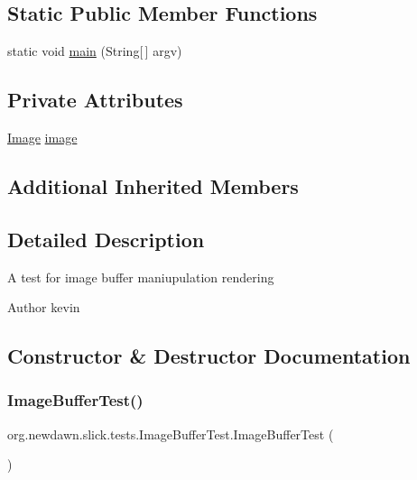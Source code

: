 \subsection*{Static Public Member Functions}
\begin{DoxyCompactItemize}
\item 
static void \mbox{\hyperlink{classorg_1_1newdawn_1_1slick_1_1tests_1_1_image_buffer_test_a02f4433e945ad1759d1de32c3f70757f}{main}} (String\mbox{[}$\,$\mbox{]} argv)
\end{DoxyCompactItemize}
\subsection*{Private Attributes}
\begin{DoxyCompactItemize}
\item 
\mbox{\hyperlink{classorg_1_1newdawn_1_1slick_1_1_image}{Image}} \mbox{\hyperlink{classorg_1_1newdawn_1_1slick_1_1tests_1_1_image_buffer_test_afde40a9c63dc29ce4951b86e0a721c8a}{image}}
\end{DoxyCompactItemize}
\subsection*{Additional Inherited Members}


\subsection{Detailed Description}
A test for image buffer maniupulation rendering

\begin{DoxyAuthor}{Author}
kevin 
\end{DoxyAuthor}


\subsection{Constructor \& Destructor Documentation}
\mbox{\label{classorg_1_1newdawn_1_1slick_1_1tests_1_1_image_buffer_test_a7de8d41dc4225e5ebbebf56f60f8990a}} 
\subsubsection{\texorpdfstring{Image\+Buffer\+Test()}{ImageBufferTest()}}
{\footnotesize\ttfamily org.\+newdawn.\+slick.\+tests.\+Image\+Buffer\+Test.\+Image\+Buffer\+Test (\begin{DoxyParamCaption}{ }\end{DoxyParamCaption})\hspace{0.3cm}{\ttfamily [inline]}}

